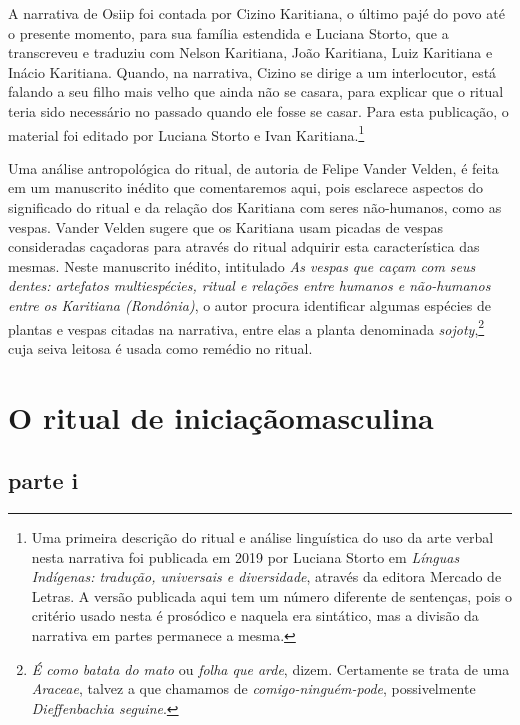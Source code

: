  A narrativa de Osiip foi contada por Cizino Karitiana, o último pajé do
 povo até o presente momento, para sua família estendida e Luciana
 Storto, que a transcreveu e traduziu com Nelson Karitiana, João
 Karitiana, Luiz Karitiana e Inácio Karitiana. Quando, na narrativa,
 Cizino se dirige a um interlocutor, está falando a seu filho mais velho
 que ainda não se casara, para explicar que o ritual teria sido
 necessário no passado quando ele fosse se casar. Para esta publicação, o
 material foi editado por Luciana Storto e Ivan Karitiana.\footnote{Uma primeira descrição do ritual e análise linguística do uso da arte
 verbal nesta narrativa foi publicada em 2019 por Luciana Storto em
 \textit{Línguas Indígenas: tradução, universais e diversidade}, através da
 editora Mercado de Letras. A versão publicada aqui tem um número
 diferente de sentenças, pois o critério usado nesta é prosódico e
 naquela era sintático, mas a divisão da narrativa em partes permanece a
 mesma.}

 Uma análise antropológica do ritual, de autoria de Felipe Vander Velden,
 é feita em um manuscrito inédito que comentaremos aqui, pois esclarece
 aspectos do significado do ritual e da relação dos Karitiana com seres
 não-humanos, como as vespas. Vander Velden sugere que os Karitiana usam
 picadas de vespas consideradas caçadoras para através do ritual adquirir
 esta característica das mesmas. Neste manuscrito inédito, intitulado
\textit{As vespas que caçam com seus dentes: artefatos multiespécies, ritual e
 relações entre humanos e não-humanos entre os Karitiana (Rondônia)}, o
 autor procura identificar algumas espécies de plantas e vespas citadas
 na narrativa, entre elas a planta denominada \textit{sojoty},\footnote{\textit{É como batata do mato} ou \textit{folha que arde},
 dizem. Certamente se trata de uma \textit{Araceae}, talvez a que chamamos
 de \textit{comigo-ninguém-pode}, possivelmente \textit{Dieffenbachia
 seguine}.} cuja seiva
 leitosa é usada como remédio no ritual.
 \vspace*{\fill}

 \chapter[O ritual de iniciação masculina]{O ritual de iniciação\break masculina}
 

\section{parte i}

